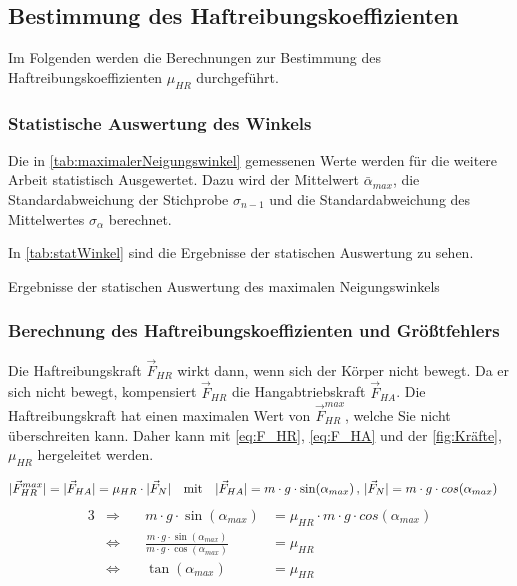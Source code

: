 \subsection{Bestimmung des Haftreibungskoeffizienten}

Im Folgenden werden die Berechnungen zur Bestimmung des Haftreibungskoeffizienten $\mu_{HR}$ durchgeführt.

\subsubsection{Statistische Auswertung des Winkels}

Die in \autoref{tab:maximalerNeigungswinkel} gemessenen Werte werden für die weitere Arbeit statistisch Ausgewertet. Dazu wird der Mittelwert $\bar{\alpha}_{max}$, die Standardabweichung der Stichprobe $\sigma_{n-1}$ und die Standardabweichung des Mittelwertes $\sigma_{\alpha}$ berechnet.

In \autoref{tab:statWinkel} sind die Ergebnisse der statischen Auswertung zu sehen.

\begin{table}[h]
    \center 
    \caption[Statistische Auswertung des maximalen Neigungswinkels]{Ergebnisse der statischen Auswertung des maximalen Neigungswinkels}
    
    \label{tab:statWinkel}
\end{table}

\subsubsection{Berechnung des Haftreibungskoeffizienten und Größtfehlers}

Die Haftreibungskraft $\vec{F}_{HR}$ wirkt dann, wenn sich der Körper nicht bewegt. Da er sich nicht bewegt, kompensiert $\vec{F}_{HR}$ die Hangabtriebskraft $\vec{F}_{HA}$. Die Haftreibungskraft hat einen maximalen Wert von $\vec{F}_{HR}^{max}$, welche Sie nicht überschreiten kann. Daher kann mit \autoref{eq:F_HR}, \autoref{eq:F_HA} und der \autoref{fig:Kräfte}, $\mu_{HR}$ hergeleitet werden.

\begin{align*}
  \lvert\vec{F}_{HR}^{max}\rvert = \lvert\vec{F}_{HA}\rvert &= \mu_{HR} \cdot \lvert\vec{F}_{N}\rvert \quad \text{mit} & \lvert\vec{F}_{HA}\rvert = m \cdot g \cdot \sin(\alpha_{max}) \, , \, \lvert\vec{F}_{N}\rvert &= m \cdot g \cdot cos(\alpha_{max})
\end{align*}
\vspace{-1cm}
\begin{alignat}{3}
  &\Rightarrow &\quad m \cdot g \cdot \sin(\alpha_{max}) &= \mu_{HR} \cdot m \cdot g \cdot cos(\alpha_{max}) \nonumber \\
  &\Leftrightarrow &\quad \frac{m \cdot g \cdot \sin(\alpha_{max})}{m \cdot g \cdot \cos(\alpha_{max})} &= \mu_{HR}\nonumber \\ 
  &\Leftrightarrow &\quad \tan(\alpha_{max}) &= \mu_{HR} \label{eq:muHR}
\end{alignat}

